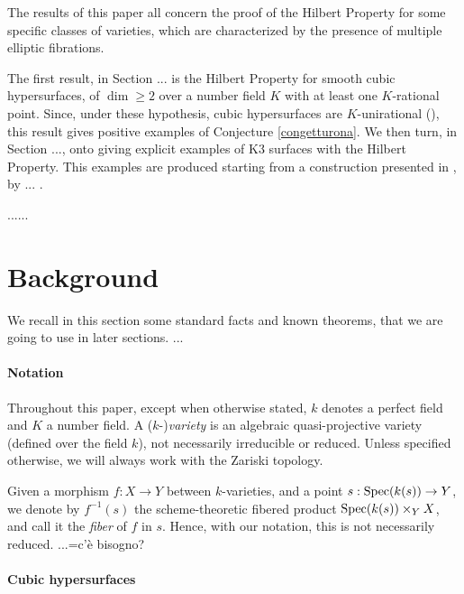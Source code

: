 \documentclass[a4paper,12pt]{article}
\begin{document}
The results of this paper all concern the proof of the Hilbert Property for some specific classes of varieties, which are characterized by the presence of multiple elliptic fibrations. 

The first result, in Section ... is the Hilbert Property for smooth cubic hypersurfaces, of $\dim \geq 2$ over a number field $K$ with at least one $K$-rational point. Since, under these hypothesis, cubic hypersurfaces are $K$-unirational (\cite[...]{unirationalcubics}), this result gives positive examples of Conjecture \ref{congetturona}. We then turn, in Section ..., onto giving explicit examples of K3 surfaces with the Hilbert Property. This examples are produced starting from a construction presented in \cite{...}, by ... .





......



\section{Background}

We recall in this section some standard facts and known theorems, that we are going to use in later sections. ...


\paragraph{Notation}

Throughout this paper, except when otherwise stated, $k$ denotes a perfect field and $K$ a number field. A ($k$-)\textit{variety} is an algebraic quasi-projective variety (defined over the field $k$), not necessarily irreducible or reduced. Unless specified otherwise, we will always work with the Zariski topology. 

Given a morphism $f:X \rightarrow Y$ between $k$-varieties, and a point $s:\operatorname{Spec}(k(s))\rightarrow Y$, we denote by $f^{-1}(s)$ the scheme-theoretic fibered product $\operatorname{Spec}(k(s))\times_Y X$, and call it the \textit{fiber} of $f$ in $s$. Hence, with our notation, this is not necessarily reduced. ...=c'è bisogno?


\paragraph{Cubic hypersurfaces}
\end{document}
